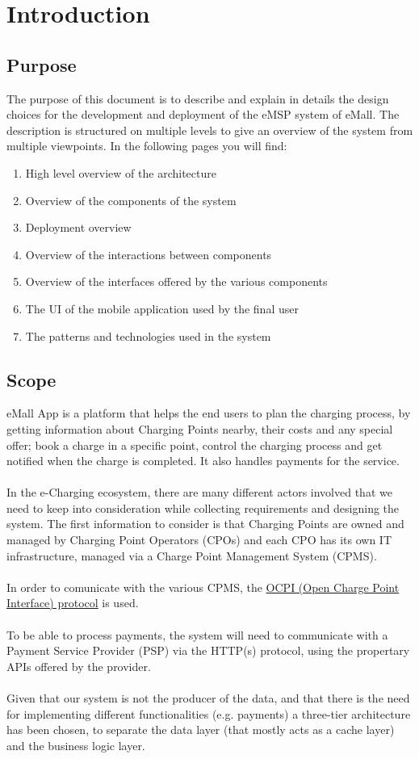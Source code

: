 \chapter{Introduction}
\section{Purpose}
The purpose of this document is to describe and explain in details the design choices for the development and deployment of the eMSP system of eMall. The description is structured on multiple levels to give an overview of the system from multiple viewpoints. In the following pages you will find:

\begin{enumerate}
	\item High level overview of the architecture
	\item Overview of the components of the system
	\item Deployment overview
	\item Overview of the interactions between components
	\item Overview of the interfaces offered by the various components
	\item The UI of the mobile application used by the final user
	\item The patterns and technologies used in the system
\end{enumerate}

\section{Scope}
eMall App is a platform that helps the end users to plan the charging process, by getting information about Charging Points nearby, their costs and any special offer; book a charge in a specific point, control the charging process and get notified when the charge is completed. It also handles payments for the service.\\\\
In the e-Charging ecosystem, there are many different actors involved that we need to keep into consideration while collecting requirements and designing the system. The first information to consider is that Charging Points are owned and managed by Charging Point Operators (CPOs) and each CPO has its own IT infrastructure, managed via a Charge Point Management System (CPMS). \\\\
In order to comunicate with the various CPMS, the 
\href{../Specs/OCPI-2.2.1.pdf}{OCPI (Open Charge Point Interface) protocol} is used.\\\\
To be able to process payments, the system will need to communicate with a Payment Service Provider (PSP) via the HTTP(s) protocol, using the propertary APIs offered by the provider.\\\\
Given that our system is not the producer of the data, and that there is the need for implementing different functionalities (e.g. payments) a three-tier architecture has been chosen, to separate the data layer (that mostly acts as a cache layer) and the business logic layer.


